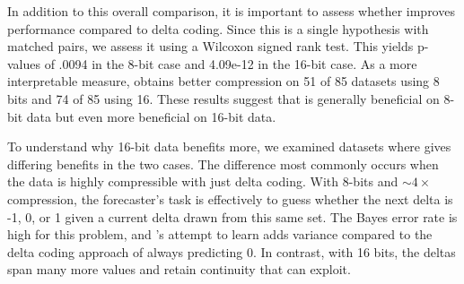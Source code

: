 In addition to this overall comparison, it is important to assess whether \fire improves performance compared to delta coding. Since this is a single hypothesis with matched pairs, we assess it using a Wilcoxon signed rank test. This yields p-values of .0094 in the 8-bit case and 4.09e-12 in the 16-bit case. As a more interpretable measure, \fire obtains better compression on 51 of 85 datasets using 8 bits and 74 of 85 using 16. These results suggest that \fire is generally beneficial on 8-bit data but even more beneficial on 16-bit data.

To understand why 16-bit data benefits more, we examined datasets where \fire gives differing benefits in the two cases. The difference most commonly occurs when the data is highly compressible with just delta coding. With 8-bits and $\sim4\times$ compression, the forecaster's task is effectively to guess whether the next delta is -1, 0, or 1 given a current delta drawn from this same set. The Bayes error rate is high for this problem, and \justfire's attempt to learn adds variance compared to the delta coding approach of always predicting 0. In contrast, with 16 bits, the deltas span many more values and retain continuity that \fire can exploit.







